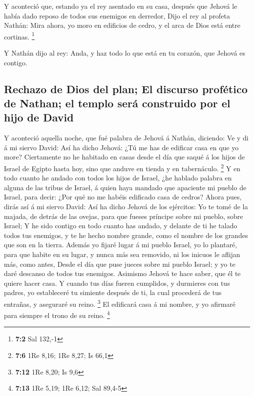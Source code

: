  Y aconteció que, estando ya el rey asentado en su casa,
después que Jehová le había dado reposo de todos sus enemigos en
derredor,  Dijo el rey al profeta Nathán: Mira ahora, yo
moro en edificios de cedro, y el arca de Dios está entre cortinas.
\footnote{\textbf{7:2} Sal 132,-1}

 Y Nathán dijo al rey: Anda, y haz todo lo que está en tu
corazón, que Jehová es contigo.

\hypertarget{rechazo-de-dios-del-plan-el-discurso-profuxe9tico-de-nathan-el-templo-seruxe1-construido-por-el-hijo-de-david}{%
\subsection{Rechazo de Dios del plan; El discurso profético de Nathan;
el templo será construido por el hijo de
David}\label{rechazo-de-dios-del-plan-el-discurso-profuxe9tico-de-nathan-el-templo-seruxe1-construido-por-el-hijo-de-david}}

 Y aconteció aquella noche, que fué palabra de Jehová á
Nathán, diciendo:  Ve y di á mi siervo David: Así ha dicho
Jehová: ¿Tú me has de edificar casa en que yo more? 
Ciertamente no he habitado en casas desde el día que saqué á los hijos
de Israel de Egipto hasta hoy, sino que anduve en tienda y en
tabernáculo. \footnote{\textbf{7:6} 1Re 8,16; 1Re 8,27; Is 66,1}
 Y en todo cuanto he andado con todos los hijos de Israel,
¿he hablado palabra en alguna de las tribus de Israel, á quien haya
mandado que apaciente mi pueblo de Israel, para decir: ¿Por qué no me
habéis edificado casa de cedros?  Ahora pues, dirás así á mi
siervo David: Así ha dicho Jehová de los ejércitos: Yo te tomé de la
majada, de detrás de las ovejas, para que fueses príncipe sobre mi
pueblo, sobre Israel;  Y he sido contigo en todo cuanto has
andado, y delante de ti he talado todos tus enemigos, y te he hecho
nombre grande, como el nombre de los grandes que son en la tierra.
 Además yo fijaré lugar á mi pueblo Israel, yo lo plantaré,
para que habite en su lugar, y nunca más sea removido, ni los inicuos le
aflijan más, como antes,  Desde el día que puse jueces
sobre mi pueblo Israel; y yo te daré descanso de todos tus enemigos.
Asimismo Jehová te hace saber, que él te quiere hacer casa.
 Y cuando tus días fueren cumplidos, y durmieres con tus
padres, yo estableceré tu simiente después de ti, la cual procederá de
tus entrañas, y aseguraré su reino. \footnote{\textbf{7:12} 1Re 8,20; Is
  9,6}  El edificará casa á mi nombre, y yo afirmaré para
siempre el trono de su reino. \footnote{\textbf{7:13} 1Re 5,19; 1Re
  6,12; Sal 89,4-5}

